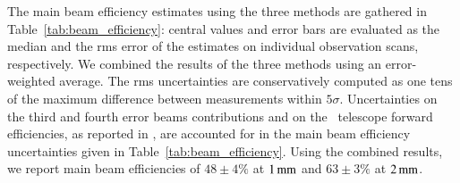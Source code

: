 

The main beam efficiency estimates using the three methods are gathered
in Table~\ref{tab:beam_efficiency}: central values and error
bars are evaluated as the median and the rms error of the
estimates on individual observation scans, respectively.
{\rev We combined the results of the three methods using an
error-weighted average. The rms uncertainties are conservatively
computed as one tens of the maximum difference between measurements
within $5\sigma$. Uncertainties on the third and fourth error beams
contributions and on the \trentemetre\ telescope forward
efficiencies, as reported in \citet{Greve1998,Kramer2013}, are
accounted for in the main beam efficiency uncertainties given in
Table~\ref{tab:beam_efficiency}.}
Using the combined results, we report main beam efficiencies of
{\rev $48 \pm 4 \%$ at $1\,\rm{mm}$ and  $63 \pm 3 \%$ at $2\,\rm{mm}$.}
  

